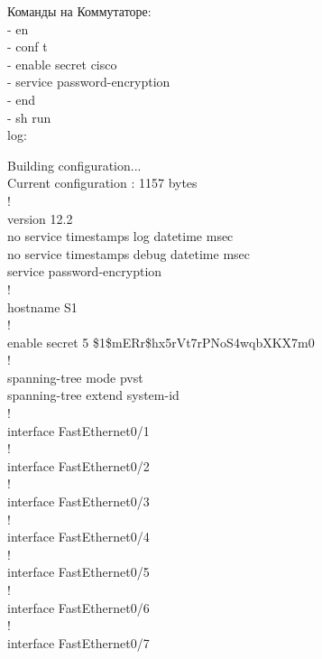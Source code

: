 \documentclass[a4paper,14pt]{extarticle}
\begin{document}
    Команды на Коммутаторе: \\
    - en\\
    - conf t\\
    - enable secret cisco\\
    - service password-encryption\\ 
    - end\\
    - sh run\\

    log:
    \begin{singlespace}
        \begin{tcolorbox}[breakable]
            Building configuration...\\
            Current configuration : 1157 bytes\\
            !\\
            version 12.2\\
            no service timestamps log datetime msec\\
            no service timestamps debug datetime msec\\
            service password-encryption\\
            !\\
            hostname S1\\
            !\\
            enable secret 5 \$1\$mERr\$hx5rVt7rPNoS4wqbXKX7m0\\
            !\\
            spanning-tree mode pvst\\
            spanning-tree extend system-id\\
            !\\
            interface FastEthernet0/1\\
            !\\
            interface FastEthernet0/2\\
            !\\
            interface FastEthernet0/3\\
            !\\
            interface FastEthernet0/4\\
            !\\
            interface FastEthernet0/5\\
            !\\
            interface FastEthernet0/6\\
            !\\
            interface FastEthernet0/7\\

\end{tcolorbox}
\end{singlespace}
\end{document}
